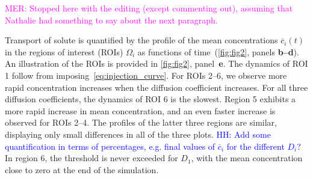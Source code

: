 \documentclass[fleqn]{wlscirep}
\newcommand{\lyng}[1]{\textcolor{blue}{#1}}
\newcommand{\mer}[1]{\textcolor{magenta}{#1}}
\begin{document}
\mer{MER: Stopped here with the editing (except commenting out), assuming that Nathalie had something to say about the next paragraph.}

Transport of solute is quantified by the profile of the mean concentrations $\overline{c}_i(t)$ in the regions of interest (ROIs) $\Omega_i$ as functions of time~(\cref{fig:fig2}, panels \textbf{b--d}).  An illustration of the ROIs is provided in \cref{fig:fig2}, panel~\textbf{e}. The dynamics of ROI 1 follow from imposing~\cref{eq:injection_curve}. For ROIs 2--6, we observe more rapid concentration increases when the diffusion coefficient increases.  For all three diffusion coefficients, the dynamics of ROI 6 is the slowest. Region 5 exhibits a more rapid increase in mean concentration, and an even faster increase is observed for ROIs 2--4. The profiles of the latter three regions are similar, displaying only small differences in all of the three plots. \lyng{HH: Add some quantification in terms of percentages, e.g. final values of $\overline{c}_i$ for the different $D_i$?}
%
%
In region 6, the threshold is never exceeded for $D_1$, with the mean concentration close to zero at the end of the simulation. 
\end{document}
